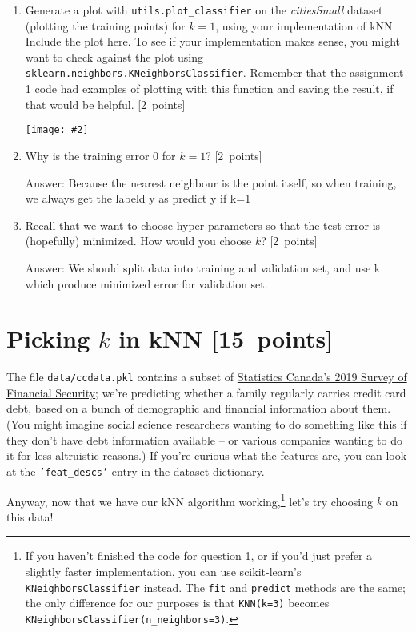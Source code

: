 \documentclass{article}
\newcommand{\blu}[1]{{\textcolor{blu}{#1}}}
\newcommand{\gre}[1]{\textcolor{gre}{#1}}
\newcommand\ans[1]{\par\gre{Answer: #1}}
\let\ask\blu
\newcommand\pts[1]{\textcolor{pointscolour}{[#1~points]}}
\newcommand{\centerfig}[2]{\begin{center}\texttt{[image: \#2]}\end{center}}
\begin{document}
\begin{enumerate}
        \item Generate a plot with \texttt{utils.plot\_classifier} on the \emph{citiesSmall} dataset (plotting the training points) for $k=1$, using your implementation of kNN. \ask{Include the plot here.} To see if your implementation makes sense, you might want to check against the plot using \texttt{sklearn.neighbors.KNeighborsClassifier}. Remember that the assignment 1 code had examples of plotting with this function and saving the result, if that would be helpful. \pts{2}
        \centerfig{0.7}{./figs/q1.pdf}
        \item Why is the training error $0$ for $k=1$? \pts{2}
        \ans{Because the nearest neighbour is the point itself, so when training, we always get the labeld y as predict y if k=1}
        \item Recall that we want to choose hyper-parameters so that the test error is (hopefully) minimized. How would you choose $k$? \pts{2}
        \ans{We should split data into training and validation set, and use k which produce minimized error for validation set.}
    \end{enumerate}

    \clearpage
    \section{Picking $k$ in kNN \pts{15}}
    The file \texttt{data/ccdata.pkl} contains a subset of \href{https://www23.statcan.gc.ca/imdb/p2SV.pl?Function=getSurvey&SDDS=2620}{Statistics Canada's 2019 Survey of Financial Security}; we're predicting whether a family regularly carries credit card debt, based on a bunch of demographic and financial information about them. (You might imagine social science researchers wanting to do something like this if they don't have debt information available -- or various companies wanting to do it for less altruistic reasons.) If you're curious what the features are, you can look at the \texttt{'feat\_descs'} entry in the dataset dictionary.

    Anyway, now that we have our kNN algorithm working,\footnote{If you haven't finished the code for question 1, or if you'd just prefer a slightly faster implementation, you can use scikit-learn's \texttt{KNeighborsClassifier} instead. The \texttt{fit} and \texttt{predict} methods are the same; the only difference for our purposes is that \texttt{KNN(k=3)} becomes \texttt{KNeighborsClassifier(n\_neighbors=3)}.} let's try choosing $k$ on this data!
\end{document}
